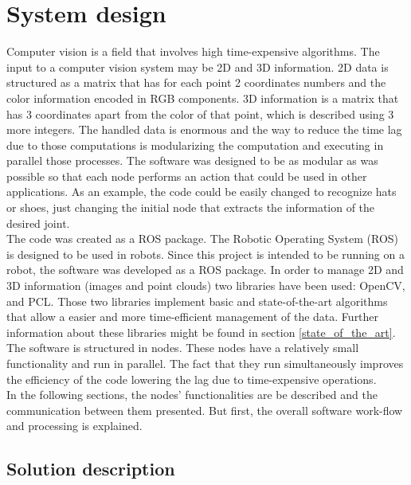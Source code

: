 \section{System design}
\label{system_design}

Computer vision is a field that involves high time-expensive algorithms. 
The input to a computer vision system may be 2D and 3D information. 
2D data is structured as a matrix that has for each point 2 coordinates numbers and the color information encoded in RGB components. 
3D information is a matrix that has 3 coordinates apart from the color of that point, which is described using 3 more integers. 
The handled data is enormous and the way to reduce the time lag due to those computations is modularizing the computation and executing in parallel those processes. 
The software was designed to be as modular as was possible so that each node performs an action that could be used in other applications. 
As an example, the code could be easily changed to recognize hats or shoes, just changing the initial node that extracts the information of the desired joint. 
\\

The code was created as a ROS package. 
The Robotic Operating System (ROS) is designed to be used in robots. 
Since this project is intended to be running on a robot, the software was developed as a ROS package. 
In order to manage 2D and 3D information (images and point clouds) two libraries have been used: OpenCV, and PCL. Those two libraries implement basic and state-of-the-art algorithms that allow a easier and more time-efficient management of the data. Further information about these libraries might be found in section \ref{state_of_the_art}. 
\\
The software is structured in nodes. 
These nodes have a relatively small functionality and run in parallel. 
The fact that they run simultaneously improves the efficiency of the code lowering the lag due to time-expensive operations. 
\\

In the following sections, the nodes' functionalities are be described and the communication between them presented. 
But first, the overall software work-flow and processing is explained. 









\subsection{Solution description}

